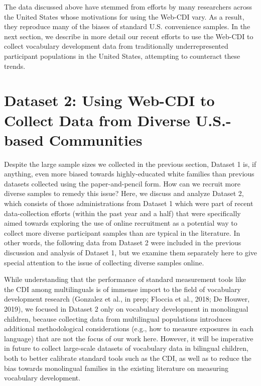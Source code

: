 \documentclass[
  english,
  ,man,floatsintext]{apa6}
\begin{document}
The data discussed above have stemmed from efforts by many researchers across the United States whose motivations for using the Web-CDI vary. As a result, they reproduce many of the biases of standard U.S. convenience samples. In the next section, we describe in more detail our recent efforts to use the Web-CDI to collect vocabulary development data from traditionally underrepresented participant populations in the United States, attempting to counteract these trends.

\hypertarget{dataset-2-using-web-cdi-to-collect-data-from-diverse-u.s.-based-communities}{%
\section{Dataset 2: Using Web-CDI to Collect Data from Diverse U.S.-based Communities}\label{dataset-2-using-web-cdi-to-collect-data-from-diverse-u.s.-based-communities}}

Despite the large sample sizes we collected in the previous section, Dataset 1 is, if anything, even more biased towards highly-educated white families than previous datasets collected using the paper-and-pencil form. How can we recruit more diverse samples to remedy this issue? Here, we discuss and analyze Dataset 2, which consists of those administrations from Dataset 1 which were part of recent data-collection efforts (within the past year and a half) that were specifically aimed towards exploring the use of online recruitment as a potential way to collect more diverse participant samples than are typical in the literature. In other words, the following data from Dataset 2 were included in the previous discussion and analysis of Dataset 1, but we examine them separately here to give special attention to the issue of collecting diverse samples online.

While understanding that the performance of standard measurement tools like the CDI among multilinguals is of immense import to the field of vocabulary development research (Gonzalez et al., in prep; Floccia et al., 2018; De Houwer, 2019), we focused in Dataset 2 only on vocabulary development in monolingual children, because collecting data from multilingual populations introduces additional methodological considerations (e.g., how to measure exposures in each language) that are not the focus of our work here. However, it will be imperative in future to collect large-scale datasets of vocabulary data in bilingual children, both to better calibrate standard tools such as the CDI, as well as to reduce the bias towards monolingual families in the existing literature on measuring vocabulary development.
\end{document}
